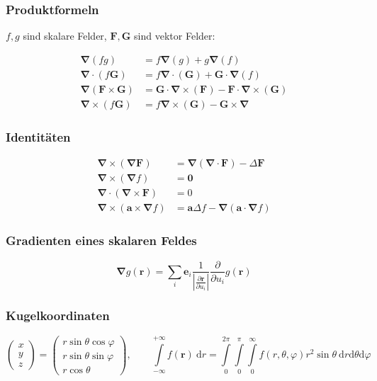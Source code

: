 \documentclass[titlepage,11pt,a4paper,ngerman]{report}
\newcommand{\prt}[2]{\frac{\partial #1}{\partial #2}}
\renewcommand{\vec}[1]{\boldsymbol{#1}}
\newcommand{\vabla}{\boldsymbol{\nabla}}
\renewcommand{\paragraph}[1]{\subsubsection{#1}}
\begin{document}
\paragraph{Produktformeln}
$f, g$ sind skalare Felder, $\vec{F}, \vec{G}$ sind vektor Felder:

\begin{align*}
 	\vabla(fg) &= f \vabla (g) + g \vabla (f)\\
 	\vabla \cdot (f \vec{G}) &= f \vabla \cdot (\vec{G}) + \vec{G} \cdot \vabla (f)\\
 	\vabla (\vec{F} \times \vec{G}) &= \vec{G} \cdot \vabla \times (\vec{F}) - \vec{F} \cdot \vabla \times (\vec{G})\\
 	\vabla \times (f \vec{G}) &= f \vabla \times (\vec{G}) - \vec{G} \times \vabla
\end{align*}

\paragraph{Identitäten}

\begin{align*}
	\vec{\nabla}\times(\vec{\nabla}\vec{F})&=\vec{\nabla}(\vec{\nabla}\cdot\vec{F})-\Delta\vec{F}\\
	\vec{\nabla}\times(\vec{\nabla}f)&=\vec{0}\\
	\vec{\nabla}\cdot(\vec{\nabla}\times\vec{F})&=0\\
	\vec{\nabla}\times(\vec{a}\times\vec{\nabla}f)&=\vec{a}\Delta f-\vec{\nabla}(\vec{a}\cdot\vec{\nabla}f)
\end{align*}

\paragraph{Gradienten eines skalaren Feldes}
$$\vabla g(\vec{r}) = \sum_i \vec{e}_i \frac{1}{\left|\prt{\vec{r}}{u_i}\right|}\prt{}{u_i}g(\vec{r})$$

\paragraph{Kugelkoordinaten}
$$
\begin{pmatrix}
	x \\ y\\ z
\end{pmatrix}
=
\begin{pmatrix}
	r \sin \theta \cos \varphi\\
	r \sin \theta \sin \varphi\\
	r \cos \theta
\end{pmatrix}
, \qquad \int\limits_{-\infty}^{+\infty} f(\vec{r})\ \textrm{d}r = \int\limits_{0}^{2 \pi} \int\limits_{0}^{\pi} \int\limits_{0}^{\infty} f(r,\theta,\varphi) r^2 \sin \theta\ \textrm{d}r \textrm{d}\theta \textrm{d}\varphi
$$
\end{document}
